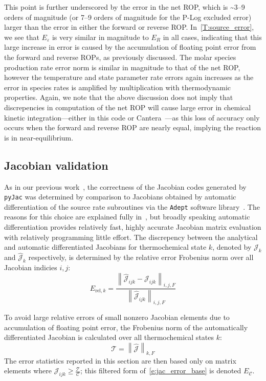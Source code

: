 \documentclass[12pt,number,sort&compress]{elsarticle}
\begin{document}
This point is further underscored by the error in the net ROP, which is \textasciitilde\numrange{3}{9} orders of magnitude (or \numrange{7}{9} orders of magnitude for the P-Log excluded error) larger than the error in either the forward or reverse ROP.
In~\cref{T:source_error}, we see that $E_{\varepsilon}$ is very similar in magnitude to $E_R$ in all cases, indicating that this large increase in error is caused by the accumulation of floating point error from the forward and reverse ROPs, as previously discussed.
The molar species production rate error norm is similar in magnitude to that of the net ROP, however the temperature and state parameter rate errors again increases as the error in species rates is amplified by multiplication with thermodynamic properties.
Again, we note that the above discussion does not imply that discrepencies in computation of the net ROP will cause large error in chemical kinetic integration---either in this code or Cantera~\cite{Cantera}---as this loss of accuracy only occurs when the forward and reverse ROP are nearly equal, implying the reaction is in near-equilibrium.

\subsection{Jacobian validation}

As in our previous work~\cite{Niemeyer:2016aa}, the correctness of the Jacobian codes generated by \texttt{pyJac} was determined by comparison to Jacobians obtained by automatic differentiation of the source rate subroutines via the \texttt{Adept} software library~\cite{adept-v11,hogan2014fast}.
The reasons for this choice are explained fully in~\cite{Niemeyer:2016aa}, but broadly speaking automatic differentiation provides relatively fast, highly accurate Jacobian matrix evaluation with relatively programming little effort.
The discrepency between the analytical and automatic differentiated Jacobians for thermochemical state $k$, denoted by $\mathcal{J}_k$ and $\hat{\mathcal{J}}_k$ respectively, is determined by the relative error Frobenius norm over all Jacobian indicies $i, j$:
\begin{equation}
 \label{e:jac_error_base}
 E_{\text{rel}, k} = \frac{\left\lVert \hat{\mathcal{J}}_{ijk} - \mathcal{J}_{ijk} \right\rVert_{i,j,F}}{\left\lVert \hat{\mathcal{J}}_{ijk} \right\rVert_{i,j,F}}
\end{equation}

To avoid large relative errors of small nonzero Jacobian elements due to accumulation of floating point error, the Frobenius norm of the automatically differentiated Jacobian is calculated over all thermochemical states $k$:
\begin{equation}
 \label{e:thresh}
 \mathcal{T} = \left\lVert \mathcal{\hat{J}} \right\rVert_{k, F}
\end{equation}
The error statistics reported in this section are then based only on matrix elements where $\mathcal{J}_{ijk} \ge \frac{\mathcal{T}}{\mathcal{C}}$; this filtered form of~\cref{e:jac_error_base} is denoted $E_{\mathcal{C}}$.
\end{document}
